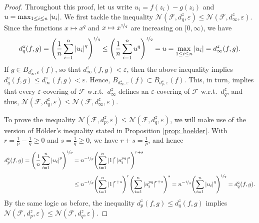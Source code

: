 \begin{proof}
Throughout this proof, let us write $u_i = f(z_i) - g(z_i)$ and $u = \max_{1 \leq i \leq n} \abs{u_i}$. We first tackle the inequality $\mathcal{N}(\mathcal{F}, d_q^z, \varepsilon) \leq \mathcal{N}(\mathcal{F}, d_{\infty}^z, \varepsilon)$. Since the functions $x \mapsto x^q$ and $x \mapsto x^{\nicefrac{1}{q}}$ are increasing on $[0, \infty)$, we have
\[
    d_q^z(f, g) = \left(\frac{1}{n} \sum_{i=1}^n \abs{u_i}^q\right)^{\nicefrac{1}{q}} \leq \left(\frac{1}{n} \sum_{i=1}^n u^q\right)^{\nicefrac{1}{q}} = u = \max_{1 \leq i \leq n} \abs{u_i} = d_{\infty}^z(f, g).
\]
If $g \in B_{d_{\infty}^z, \varepsilon}(f)$, so that $d_{\infty}^z(f, g) < \varepsilon$, then the above inequality implies $d_q^z(f, g) \leq d_{\infty}^z(f, g) < \varepsilon$. Hence, $B_{d_{\infty}^z, \varepsilon}(f) \subset B_{d_q^z, \varepsilon}(f)$. This, in turn, implies that every $\varepsilon$-covering of $\mathcal{F}$ w.r.t.\ $d_{\infty}^z$ defines an $\varepsilon$-covering of $\mathcal{F}$ w.r.t.\ $d_q^z$, and thus, $\mathcal{N}(\mathcal{F}, d_q^z, \varepsilon) \leq \mathcal{N}(\mathcal{F}, d_{\infty}^z, \varepsilon)$.

To prove the inequality $\mathcal{N}(\mathcal{F}, d_p^z, \varepsilon) \leq \mathcal{N}(\mathcal{F}, d_q^z, \varepsilon)$, we will make use of the version of H{\"o}lder's inequality stated in Proposition \ref{prop: hoelder}. With $r = \frac{1}{p} - \frac{1}{q} \geq 0$ and $s = \frac{1}{q} \geq 0$, we have $r + s = \frac{1}{p}$, and hence
\begin{align*}
    d_p^z(f, g) = \left(\frac{1}{n} \sum_{i=1}^n \abs{u_i}^p\right)^{\nicefrac{1}{p}} &= n^{-\nicefrac{1}{p}} \left(\sum_{i=1}^n \abs{1}^r \abs{u_i^{pq}}^s\right)^{r+s} \\[4pt]
    &\leq n^{-\nicefrac{1}{p}} \left(\sum_{i=1}^n \abs{1}^{r+s}\right)^r \left(\sum_{i=1}^n \abs{u_i^{pq}}^{r+s}\right)^s = n^{-\nicefrac{1}{q}} \left(\sum_{i=1}^n \abs{u_i}^{q}\right)^{\nicefrac{1}{q}} = d_q^z(f, g).
\end{align*}
By the same logic as before, the inequality $d_p^z(f, g) \leq d_q^z(f, g)$ implies $\mathcal{N}(\mathcal{F}, d_p^z, \varepsilon) \leq \mathcal{N}(\mathcal{F}, d_q^z, \varepsilon)$.
\end{proof}
